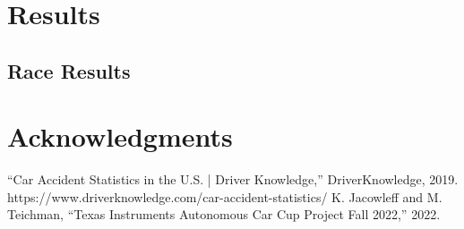 \documentclass[conference]{IEEEtran}
\begin{document}
\section{Results}

\subsection{Race Results}


\section*{Acknowledgments}

\begin{thebibliography}{00}
 “Car Accident Statistics in the U.S. | Driver Knowledge,” DriverKnowledge, 2019. https://www.driverknowledge.com/car-accident-statistics/
 K. Jacowleff and M. Teichman, “Texas Instruments Autonomous Car Cup Project Fall 2022,” 2022.
\end{thebibliography}
\end{document}
